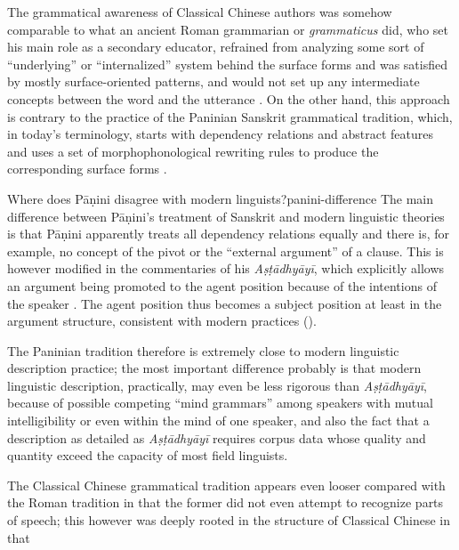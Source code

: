 \documentclass[UTF8, a4paper, oneside, scheme=plain, 12pt]{ctexrep}
\newcommand*{\citepages}[1]{pp.~{#1}}
\newcommand{\form}[1]{\emph{#1}}
\newcommand{\work}[1]{\textit{#1}}
\begin{document}
The grammatical awareness of Classical Chinese authors was somehow comparable to 
what an ancient Roman grammarian or \form{grammaticus} did,
who set his main role as a secondary educator,
refrained from analyzing some sort of ``underlying'' or ``internalized'' system behind the surface forms
and was satisfied by mostly surface-oriented patterns,
and would not set up any intermediate concepts between the word and the utterance
\citep[\citepages{7,35,47-48}]{matthews2019graeco}.
On the other hand, this approach is contrary to the practice
of the Paninian Sanskrit grammatical tradition,
which, in today's terminology, starts with dependency relations and abstract features
and uses a set of morphophonological rewriting rules to produce the corresponding surface forms
\citep{kiparsky2009architecture}.

\begin{theorybox}{Where does Pāṇini disagree with modern linguists?}{panini-difference}
    The main difference between Pāṇini's treatment of Sanskrit and modern linguistic theories
    is that Pāṇini apparently treats all dependency relations equally
    and there is, for example, no concept of the pivot or the ``external argument'' of a clause.
    This is however modified in the commentaries of his \work{Aṣṭādhyāyī},
    which explicitly allows an argument being promoted to the agent position 
    because of the intentions of the speaker \citep{keidan2017subjecthood}.
    The agent position thus becomes a subject position at least in the argument structure, consistent with modern practices ().

    The Paninian tradition therefore is extremely close to modern linguistic description practice;
    the most important difference probably is that
    modern linguistic description, practically, may even be less rigorous than \work{Aṣṭādhyāyī},
    because of possible competing ``mind grammars'' among speakers with mutual intelligibility
    or even within the mind of one speaker,
    and also the fact that a description as detailed as \work{Aṣṭādhyāyī}
    requires corpus data whose quality and quantity exceed the capacity of most field linguists.
\end{theorybox}

The Classical Chinese grammatical tradition appears even looser compared with the Roman tradition
in that the former did not even attempt to recognize parts of speech;
this however was deeply rooted in the structure of Classical Chinese
in that 
\end{document}
